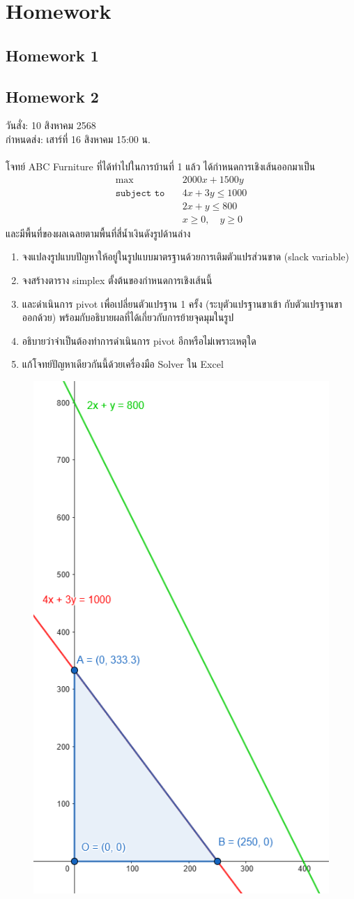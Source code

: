 \chapter{Homework}
\newpage
\section*{Homework 1}
\newpage
\section*{Homework 2}
วันสั่ง: 10 สิงหาคม 2568\\
กำหนดส่ง: เสาร์ที่ 16 สิงหาคม 15:00 น.\\~\\
\noindent โจทย์ ABC Furniture ที่ได้ทำไปในการบ้านที่ 1 แล้ว ได้กำหนดการเชิงเส้นออกมาเป็น
\begin{align*}
    \max \quad & 2000x + 1500y \\
    \texttt{subject to} \quad
    & 4x + 3y \leq 1000 \\
    & 2x + y \leq 800 \\
    & x \geq 0, \quad y \geq 0 
\end{align*}
และมีพื้นที่ของผลเฉลยตามพื้นที่สี่น้ำเงินดังรูปด้านล่าง 
\begin{enumerate}
    \item จงแปลงรูปแบบปัญหาให้อยู่ในรูปแบบมาตรฐานด้วยการเติมตัวแปรส่วนขาด (slack variable)
    \item จงสร้างตาราง simplex ตั้งต้นของกำหนดการเชิงเส้นนี้
    \item และดำเนินการ pivot เพื่อเปลี่ยนตัวแปรฐาน 1 ครั้ง (ระบุตัวแปรฐานขาเข้า กับตัวแปรฐานขาออกด้วย) พร้อมกับอธิบายผลที่ได้เกี่ยวกับการย้ายจุดมุมในรูป
    \item อธิบายว่าจำเป็นต้องทำการดำเนินการ pivot อีกหรือไม่เพราะเหตุใด
    \item แก้โจทย์ปัญหาเดียวกันนี้ด้วยเครื่องมือ Solver ใน Excel
\end{enumerate}
\begin{figure}[h]
    \includegraphics[width=0.37\linewidth]{hw2-1.png}
\end{figure}

